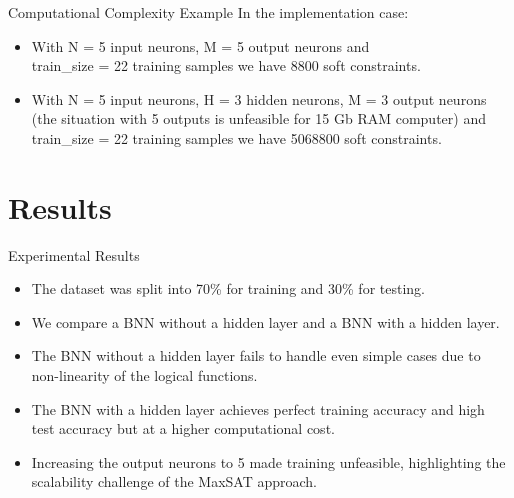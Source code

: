 \documentclass[12pt]{beamer}
\begin{document}
\begin{frame}{Computational Complexity Example}
In the implementation case:
\begin{itemize}
    \item With N = 5 input neurons, M = 5 output neurons and \\
    train\_size = 22 training samples we have 8800 soft constraints.
    \item With N = 5 input neurons, H = 3 hidden neurons, M = 3 output neurons (the situation with 5 outputs is unfeasible for 15 Gb RAM computer) and train\_size = 22 training samples we have 5068800 soft constraints.
\end{itemize}
\end{frame}


\section{Results}

\begin{frame}{Experimental Results}
\begin{itemize}
    \item The dataset was split into 70\% for training and 30\% for testing.
    \item We compare a BNN without a hidden layer and a BNN with a hidden layer.
    \item The BNN without a hidden layer fails to handle even simple cases due to non-linearity of the logical functions.
    \item The BNN with a hidden layer achieves perfect training accuracy and high test accuracy but at a higher computational cost.
       \item Increasing the output neurons to 5 made training unfeasible, highlighting the scalability challenge of the MaxSAT approach.
\end{itemize}
\end{frame}
\end{document}
